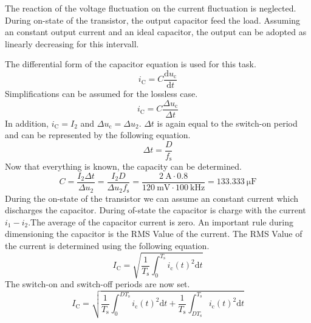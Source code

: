\begin{solutionblock}
    The reaction of the voltage fluctuation on the current fluctuation is neglected. During on-state of the transistor, the output capacitor feed the load. Assuming an constant output current and an ideal capacitor, the output can be adopted as linearly decreasing for this intervall.

    The differential form of the capacitor equation is used for this task.
    \begin{equation}
        i_\mathrm{C}=C \frac{\mathrm{d}u_\mathrm{c}}{\mathrm{d}t}
    \end{equation}
    Simplifications can be assumed for the lossless case.
    \begin{equation}
        i_\mathrm{C}=C \frac{\Delta u_\mathrm{c}}{\Delta t}
    \end{equation}
    In addition, $i_\mathrm{C}=I_\mathrm{2}$ and $\Delta u_\mathrm{c}=\Delta u_\mathrm{2}$.
    $\Delta t$ is again equal to the switch-on period and can be represented by the following equation.
    \begin{equation}
        \Delta t = \frac{D}{f_\mathrm{s}}  
    \end{equation}
    Now that everything is known, the capacity can be determined.
    \begin{equation}
        C = \frac{I_\mathrm{2}\Delta t}{\Delta u_\mathrm{2}}= \frac{I_\mathrm{2}D}{\Delta u_\mathrm{2}f_\mathrm{s}}=\frac{\SI{2}{\ampere}\cdot 0.8}{\SI{120}{\milli\volt} \cdot \SI{100}{\kilo\hertz}}=\SI{133.333}{\micro\farad}
    \end{equation}
     During the on-state of the transistor we can assume an constant current which discharges the capacitor. During of-state the capacitor is charge with the current $i_\mathrm{1}-i_\mathrm{2}$.The average of the capacitor current is zero. An important rule during dimensioning the capacitor is the RMS Value of the current.
     The RMS Value of the current is determined using the following equation.
     \begin{equation}
        I_\mathrm{C}=\sqrt{\frac{1}{T_\mathrm{s}}\int_{0}^{T_\mathrm{s}}i_\mathrm{c}(t)^2\mathrm{d}t}
     \end{equation}
     The switch-on and switch-off periods are now set.
     \begin{equation}
        I_\mathrm{C}=\sqrt{\frac{1}{T_\mathrm{s}}\int_{0}^{DT_\mathrm{s}}i_\mathrm{c}(t)^2\mathrm{d}t+\frac{1}{T_\mathrm{s}}\int_{DT_\mathrm{s}}^{T_\mathrm{s}}i_\mathrm{c}(t)^2\mathrm{d}t}

\end{equation}
\end{solutionblock}
